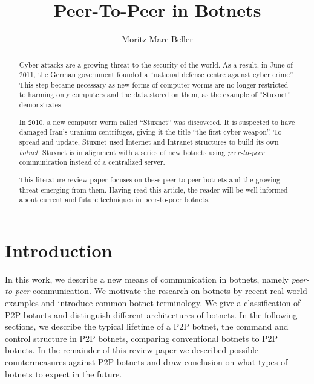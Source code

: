 \documentclass{llncs}
\title{Peer-To-Peer in Botnets}
\author{Moritz Marc Beller}
\institute{%
   Fakultät für Informatik, \\
   Technische Universität München \\
   \email{\{beller\}@in.tum.de}
}
\begin{document}
\maketitle

\begin{abstract}
Cyber-attacks are a growing threat to the security of the world. As a
result, in June of 2011, the German government founded a ``national
defense centre against cyber crime''.\cite{cyber} This step became
necessary as new forms of computer worms are no longer restricted to
harming only computers and the data stored on them, as the example of
``Stuxnet'' demonstrates:

 In 2010, a new computer worm called ``Stuxnet'' was discovered. It is
 suspected to have damaged Iran's uranium centrifuges, giving it the
 title ``the first cyber weapon''\cite{benzin2011first}. To spread and
 update, Stuxnet used Internet and Intranet structures to build its
 own {\it botnet}.\cite{fallierew32} Stuxnet is in alignment with a series
 of new botnets using {\it peer-to-peer} communication instead of a
 centralized server. 

This literature review paper focuses on these peer-to-peer botnets and
the growing threat emerging from them. Having read this article, the
reader will be well-informed about current and future techniques in
peer-to-peer botnets.
\end{abstract}

\section{Introduction}

In this work, we describe a new means of communication in botnets,
namely {\it peer-to-peer} communication.  We motivate the research on
botnets by recent real-world examples and introduce common botnet
terminology. We give a classification of P2P botnets and distinguish
different architectures of botnets. In the following sections, we
describe the typical lifetime of a P2P botnet, the command and control
structure in P2P botnets, comparing conventional botnets to P2P
botnets. In the remainder of this review paper we described possible
countermeasures against P2P botnets and draw conclusion on what types
of botnets to expect in the future.
\end{document}

